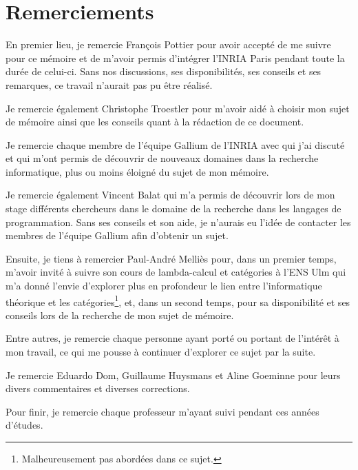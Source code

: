 \chapter*{Remerciements}

En premier lieu, je remercie François Pottier pour avoir accepté de me suivre
pour ce mémoire et de m'avoir permis d'intégrer l'INRIA Paris pendant toute la
durée de celui-ci. Sans nos discussions, ses disponibilités, ses conseils et ses
remarques, ce travail n'aurait pas pu être réalisé.

Je remercie également Christophe Troestler pour m'avoir aidé à choisir mon sujet
de mémoire ainsi que les conseils quant à la rédaction de ce document.

Je remercie chaque membre de l'équipe Gallium de
l'INRIA avec qui j'ai discuté et qui m'ont permis de découvrir de nouveaux
domaines dans la recherche informatique, plus ou moins éloigné du sujet de mon mémoire.

Je remercie également Vincent Balat qui m'a permis de découvrir lors de mon
stage différents chercheurs dans le domaine de la recherche dans les langages de
programmation. Sans ses conseils et son aide, je n'aurais eu l'idée de contacter
les membres de l'équipe Gallium afin d'obtenir un sujet.

Ensuite, je tiens à remercier Paul-André Melliès pour, dans un premier temps,
m'avoir invité à suivre son cours de lambda-calcul et catégories à l'ENS Ulm qui
m'a donné l'envie d'explorer plus en profondeur le lien entre l'informatique
théorique et les catégories\footnote{Malheureusement pas abordées dans ce sujet.}, et,
dans un second temps, pour sa disponibilité et ses conseils lors de la recherche
de mon sujet de mémoire.

Entre autres, je remercie chaque personne ayant porté ou portant de l'intérêt à mon
travail, ce qui me pousse à continuer d'explorer ce sujet par la suite.

Je remercie Eduardo Dom, Guillaume Huysmans et Aline Goeminne pour leurs
divers commentaires et diverses corrections.


Pour finir, je remercie chaque professeur m'ayant suivi pendant ces années
d'études.